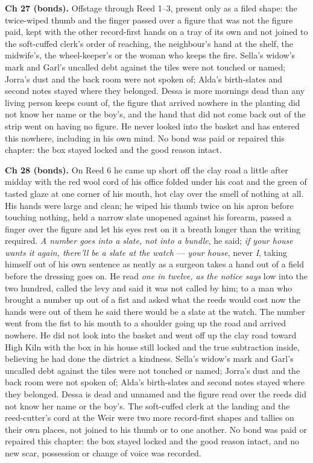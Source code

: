 \documentclass{design/chronicle}
\begin{document}
{\textbf{Ch 27 (bonds).} Offstage through Reed 1–3, present only as a filed shape: the twice-wiped thumb and the finger passed over a figure that was not the figure paid, kept with the other record-first hands on a tray of its own and not joined to the soft-cuffed clerk’s order of reaching, the neighbour’s hand at the shelf, the midwife’s, the wheel-keeper’s or the woman who keeps the fire. Sella’s widow’s mark and Garl’s uncalled debt against the tiles were not touched or named; Jorra’s dust and the back room were not spoken of; Alda’s birth-slates and second notes stayed where they belonged. Dessa is more mornings dead than any living person keeps count of, the figure that arrived nowhere in the planting did not know her name or the boy’s, and the hand that did not come back out of the strip went on having no figure. He never looked into the basket and has entered this nowhere, including in his own mind. No bond was paid or repaired this chapter: the box stayed locked and the good reason intact.

\textbf{Ch 28 (bonds).} On Reed 6 he came up short off the clay road a little after midday with the red wool cord of his office folded under his coat and the green of tasted glaze at one corner of his mouth, hot clay over the smell of nothing at all. His hands were large and clean; he wiped his thumb twice on his apron before touching nothing, held a narrow slate unopened against his forearm, passed a finger over the figure and let his eyes rest on it a breath longer than the writing required. \emph{A number goes into a slate, not into a bundle}, he said; \emph{if your house wants it again, there’ll be a slate at the watch} — \emph{your house}, never \emph{I}, taking himself out of his own sentence as neatly as a surgeon takes a hand out of a field before the dressing goes on. He read \emph{one in twelve, as the notice says} low into the two hundred, called the levy and said it was not called by him; to a man who brought a number up out of a fist and asked what the reeds would cost now the hands were out of them he said there would be a slate at the watch. The number went from the fist to his mouth to a shoulder going up the road and arrived nowhere. He did not look into the basket and went off up the clay road toward High Kiln with the box in his house still locked and the true subtraction inside, believing he had done the district a kindness. Sella’s widow’s mark and Garl’s uncalled debt against the tiles were not touched or named; Jorra’s dust and the back room were not spoken of; Alda’s birth-slates and second notes stayed where they belonged. Dessa is dead and unnamed and the figure read over the reeds did not know her name or the boy’s. The soft-cuffed clerk at the landing and the reed-cutter’s cord at the Weir were two more record-first shapes and tallies on their own places, not joined to his thumb or to one another. No bond was paid or repaired this chapter: the box stayed locked and the good reason intact, and no new scar, possession or change of voice was recorded.

}
\end{document}
